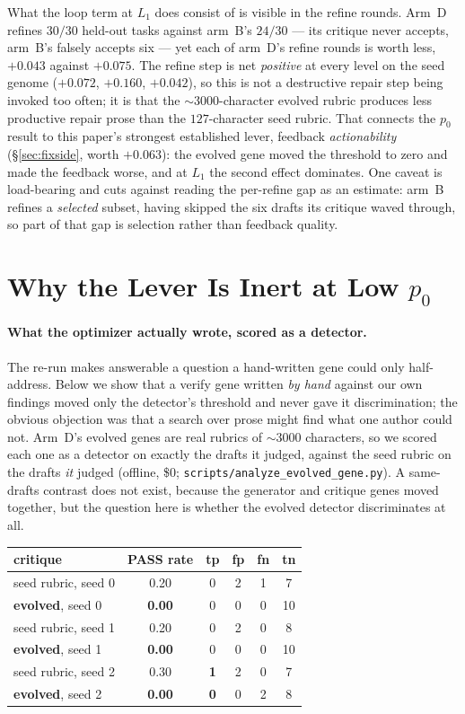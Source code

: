 \documentclass[11pt]{article}
\begin{document}
What the loop term at $L_1$ does consist of is visible in the refine rounds. Arm~D refines
$30/30$ held-out tasks against arm~B's $24/30$ --- its critique never accepts, arm~B's falsely
accepts six --- yet each of arm~D's refine rounds is worth less, $+0.043$ against $+0.075$. The
refine step is net \emph{positive} at every level on the seed genome ($+0.072$, $+0.160$,
$+0.042$), so this is not a destructive repair step being invoked too often; it is that the
${\sim}3000$-character evolved rubric produces less productive repair prose than the
$127$-character seed rubric. That connects the $p_0$ result to this paper's strongest
established lever, feedback \emph{actionability} (\S\ref{sec:fixside}, worth $+0.063$): the
evolved gene moved the threshold to zero and made the feedback worse, and at $L_1$ the second
effect dominates. One caveat is load-bearing and cuts against reading the per-refine gap as an
estimate: arm~B refines a \emph{selected} subset, having skipped the six drafts its critique
waved through, so part of that gap is selection rather than feedback quality.


\section{Why the Lever Is Inert at Low \texorpdfstring{$p_0$}{p0}}
\label{sec:analysis}

\paragraph{What the optimizer actually wrote, scored as a detector.}
The re-run makes answerable a question a hand-written gene could only half-address. Below we
show that a verify gene written \emph{by hand} against our own findings moved only the
detector's threshold and never gave it discrimination; the obvious objection was that a
search over prose might find what one author could not. Arm~D's evolved genes are real
rubrics of ${\sim}3000$ characters, so we scored each one as a detector on exactly the drafts
it judged, against the seed rubric on the drafts \emph{it} judged (offline, \$0;
\texttt{scripts/analyze\_evolved\_gene.py}). A same-drafts contrast does not exist, because
the generator and critique genes moved together, but the question here is whether the evolved
detector discriminates at all.

\begin{center}\small
\begin{tabular}{lccccc}
\toprule
critique & PASS rate & tp & fp & fn & tn \\
\midrule
seed rubric, seed 0 & 0.20 & 0 & 2 & 1 & 7 \\
\textbf{evolved}, seed 0 & \textbf{0.00} & 0 & 0 & 0 & 10 \\
seed rubric, seed 1 & 0.20 & 0 & 2 & 0 & 8 \\
\textbf{evolved}, seed 1 & \textbf{0.00} & 0 & 0 & 0 & 10 \\
seed rubric, seed 2 & 0.30 & \textbf{1} & 2 & 0 & 7 \\
\textbf{evolved}, seed 2 & \textbf{0.00} & \textbf{0} & 0 & 2 & 8 \\
\bottomrule
\end{tabular}
\end{center}
\end{document}
